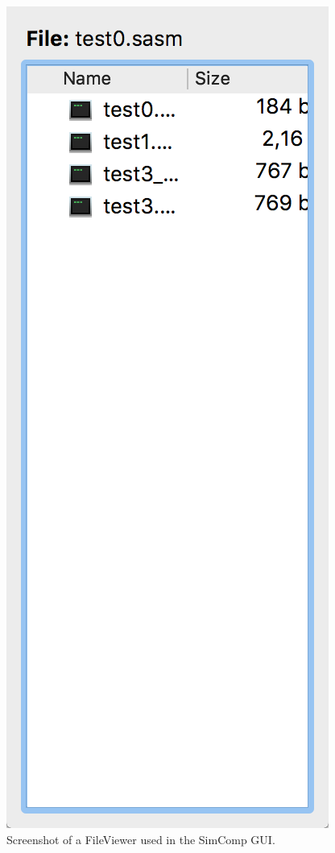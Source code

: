 \begin{description}
\begin{figure}[H]
\centering
\includegraphics[scale=0.5]{img/FileViewer.png}
\caption{Screenshot of a FileViewer used in the SimComp GUI.}
\label{fig:fileviewer}
\end{figure}


\end{description}
